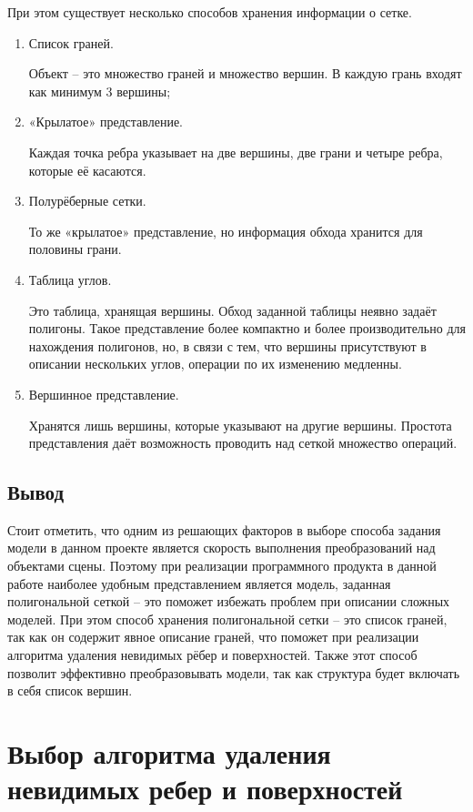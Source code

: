 При этом существует несколько способов хранения информации о сетке.

\begin{enumerate}

\item Список граней. 

Объект – это множество граней и множество вершин. В каждую грань входят как минимум 3 вершины;
\item«Крылатое» представление. 

Каждая точка ребра указывает на две вершины, две грани и четыре ребра, которые её касаются.

\item Полурёберные сетки.

 То же «крылатое» представление, но информация обхода хранится для половины грани.
 
\item Таблица углов.

 Это таблица, хранящая вершины. Обход заданной таблицы неявно задаёт полигоны. Такое представление более компактно и более производительно для нахождения полигонов, но, в связи с тем, что вершины присутствуют в описании нескольких углов, операции по их изменению медленны.
 
\item Вершинное представление.

Хранятся лишь вершины, которые указывают на другие вершины. Простота представления даёт возможность проводить над сеткой множество операций.

\end{enumerate}

\subsection{Вывод}
Стоит отметить, что одним из решающих факторов в выборе способа задания модели в данном проекте является скорость выполнения преобразований над объектами сцены. Поэтому при реализации программного продукта в данной работе наиболее удобным представлением является модель, заданная полигональной сеткой – это поможет избежать проблем при описании сложных моделей. При этом способ хранения полигональной сетки -- это список граней, так как он содержит явное описание граней, что поможет при реализации алгоритма удаления невидимых рёбер и поверхностей. Также этот способ позволит эффективно преобразовывать модели, так как структура будет включать в себя список вершин. 


\section{Выбор алгоритма удаления невидимых ребер и поверхностей}

